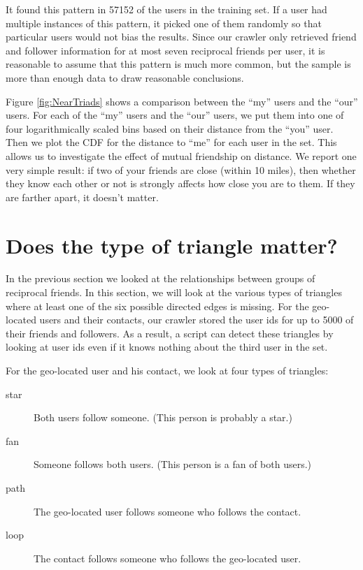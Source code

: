 It found this pattern in 57152 of the users in the training set.
If a user had multiple instances of this pattern, it picked one of them
randomly so that particular users would not bias the results.
Since our crawler only retrieved friend and follower information for at most
seven reciprocal friends per user, it is reasonable to assume that this pattern
is much more common, but the sample is more than enough data to draw reasonable
conclusions.

Figure \ref{fig:NearTriads} shows a comparison between the ``my'' users and the
``our'' users.
For each of the ``my'' users and the ``our'' users, we put them into one of
four logarithmically scaled bins based on their distance from the ``you'' user.
Then we plot the CDF for the distance to ``me'' for each user in the set. This
allows us to investigate the effect of mutual friendship on distance.
We report one very simple result: if two of your friends are close (within 10
miles), then whether they know each other or not is strongly affects how close
you are to them. If they are farther apart, it doesn't matter.

\section{Does the type of triangle matter?}


In the previous section we looked at the relationships between groups of
reciprocal friends.
In this section, we will look at the various types of triangles where at least
one of the six possible directed edges is missing.
For the geo-located users and their contacts, our crawler stored the user ids
for up to 5000 of their friends and followers.
As a result, a script can detect these triangles by looking at user ids even if
it knows nothing about the third user in the set.

For the geo-located user and his contact, we look at four types of triangles:
\begin{description}
\item[star] Both users follow someone. (This person is probably a star.)
\item[fan] Someone follows both users. (This person is a fan of both users.)
\item[path] The geo-located user follows someone who follows the contact.
\item[loop] The contact follows someone who follows the geo-located user.
\end{description}

